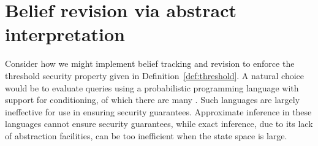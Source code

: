 



\section{Belief revision via abstract interpretation}
\label{sec:absinterp}

\setlength{\arraycolsep}{0.1cm}
\newcommand{\ajoin}[0]{\bigsqcup}


Consider how we might implement belief tracking and revision to
enforce the threshold security property given in
Definition~\ref{def:threshold}.  A natural choice would be to evaluate
queries using a probabilistic programming language with support for
conditioning, of which there are many \cite{pfeffer07ibal,
  radul07probscheme, park08sampling, goodman08church,
  kiselyov09embedded, claret12bayesian, milch05blog,
  borgstrom11measure}.  Such languages are largely
ineffective for use in ensuring security guarantees. Approximate
inference in these languages cannot ensure security guarantees, while
exact inference, due to its lack of abstraction facilities, can be too
inefficient when the state space is large.

